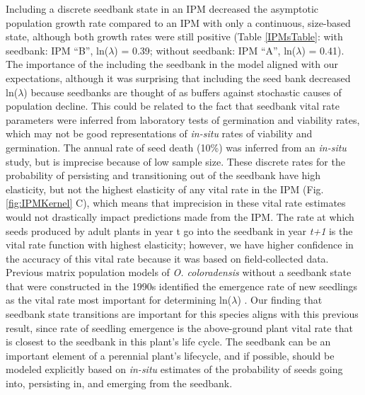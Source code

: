 \documentclass[12pt, letterpaper]{article}
\begin{document}
Including a discrete seedbank state in an IPM decreased the asymptotic population growth rate compared to an IPM with only a continuous, size-based state, although both growth rates were still positive (Table \ref{IPMsTable}: with seedbank: IPM “B”, ln($\lambda$) = 0.39; without seedbank: IPM “A”, ln($\lambda$) = 0.41). The importance of the including the seedbank in the model aligned with our expectations, although it was surprising that including the seed bank decreased ln($\lambda$) because seedbanks are thought of as buffers against stochastic causes of population decline. This could be related to the fact that seedbank vital rate parameters were inferred from laboratory tests of germination and viability rates, which may not be good representations of \textit{in-situ} rates of viability and germination. The annual rate of seed death (10\%) was inferred from an \textit{in-situ} study, but is imprecise because of low sample size. These discrete rates for the probability of persisting and transitioning out of the seedbank have high elasticity, but not the highest elasticity of any vital rate in the IPM (Fig. \ref{fig:IPMKernel} C), which means that imprecision in these vital rate estimates would not drastically impact predictions made from the IPM. The rate at which seeds produced by adult plants in year t go into the seedbank in year \textit{t+1} is the vital rate function with highest elasticity; however, we have higher confidence in the accuracy of this vital rate because it was based on field-collected data. Previous matrix population models of \textit{O. coloradensis} without a seedbank state that were constructed in the 1990s identified the emergence rate of new seedlings as the vital rate most important for determining ln($\lambda$) \cite{Floyd1998}. Our finding that seedbank state transitions are important for this species aligns with this previous result, since rate of seedling emergence is the above-ground plant vital rate that is closest to the seedbank in this plant’s life cycle. The seedbank can be an important element of a perennial plant’s lifecycle, and if possible, should be modeled explicitly based on \textit{in-situ} estimates of the probability of seeds going into, persisting in, and emerging from the seedbank.      
\end{document}
